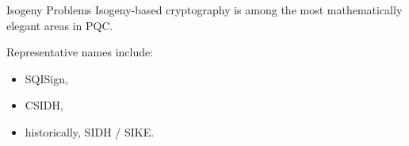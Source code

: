 \documentclass[serif, aspectratio=169]{beamer}
\begin{document}
%
%	
%
%	
%
\begin{frame}{Isogeny Problems}
	Isogeny-based cryptography is among the most mathematically elegant areas in PQC.
	
	\vspace{0.5em}
	Representative names include:
	\begin{itemize}
		\item SQISign,
		\item CSIDH,
		\item historically, SIDH / SIKE.
	\end{itemize}
\end{frame}
%
\end{document}
